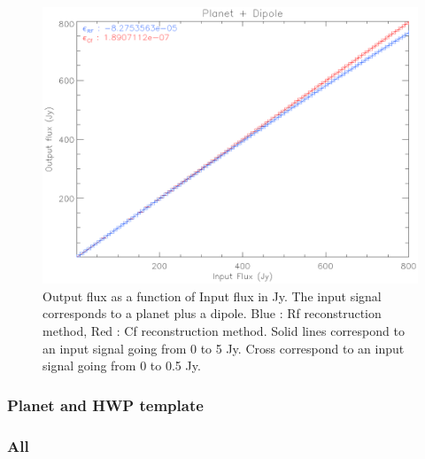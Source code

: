 \begin{figure}[h]
\center
	\includegraphics[scale=0.5]{Figures/nl-planet-dipole.eps}
	\caption{Output flux as a function of Input flux in Jy. The input signal corresponds to a planet plus a dipole. Blue : Rf reconstruction method, Red : Cf reconstruction method. Solid lines correspond to an input signal going from 0 to 5 Jy. Cross correspond to an input signal going from 0 to 0.5 Jy.}
	\label{nl-planet-dipole}
\end{figure}

\subsubsection{Planet and HWP template}
\subsubsection{All}



%


